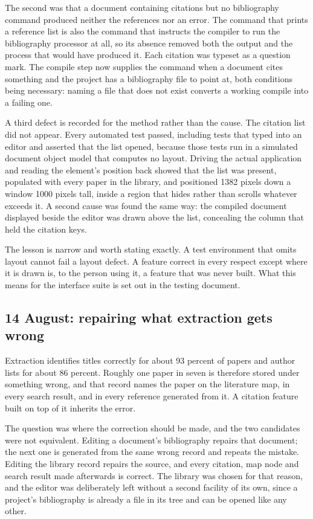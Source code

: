 \documentclass[11pt,a4paper]{article}
\begin{document}
The second was that a document containing citations but no bibliography command
produced neither the references nor an error. The command that prints a
reference list is also the command that instructs the compiler to run the
bibliography processor at all, so its absence removed both the output and the
process that would have produced it. Each citation was typeset as a question
mark. The compile step now supplies the command when a document cites something
and the project has a bibliography file to point at, both conditions being
necessary: naming a file that does not exist converts a working compile into a
failing one.

A third defect is recorded for the method rather than the cause. The citation
list did not appear. Every automated test passed, including tests that typed
into an editor and asserted that the list opened, because those tests run in a
simulated document object model that computes no layout. Driving the actual
application and reading the element's position back showed that the list was
present, populated with every paper in the library, and positioned 1382 pixels
down a window 1000 pixels tall, inside a region that hides rather than scrolls
whatever exceeds it. A second cause was found the same way: the compiled
document displayed beside the editor was drawn above the list, concealing the
column that held the citation keys.

The lesson is narrow and worth stating exactly. A test environment that omits
layout cannot fail a layout defect. A feature correct in every respect except
where it is drawn is, to the person using it, a feature that was never built.
What this means for the interface suite is set out in the testing document.

\subsection{14 August: repairing what extraction gets wrong}

Extraction identifies titles correctly for about 93 percent of papers and author
lists for about 86 percent. Roughly one paper in seven is therefore stored under
something wrong, and that record names the paper on the literature map, in every
search result, and in every reference generated from it. A citation feature built
on top of it inherits the error.

The question was where the correction should be made, and the two candidates
were not equivalent. Editing a document's bibliography repairs that document;
the next one is generated from the same wrong record and repeats the mistake.
Editing the library record repairs the source, and every citation, map node and
search result made afterwards is correct. The library was chosen for that
reason, and the editor was deliberately left without a second facility of its
own, since a project's bibliography is already a file in its tree and can be
opened like any other.
\end{document}
